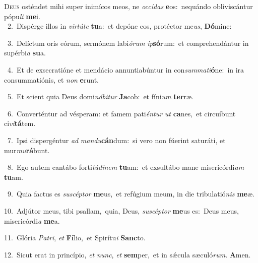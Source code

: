 \lettrine{\initial\textcolor{\initialcolor}{D}}{eus} osténdet mihi super inimícos meos, ne \textit{oc}\-\textit{cí}\textit{das} \textbf{e}\-os:~\star nequándo obliviscántur pópu\textit{li} \textbf{me}\-i.\\
{\numbfont\textcolor{\numbcolor}{~2.}}~Dispérge illos in \textit{vir}\-\textit{tú}\textit{te} \textbf{tu}\-a:~\star et depóne eos, protéctor me\-\textit{us}\-, \textbf{Dó}\-mine:\par
{\numbfont\textcolor{\numbcolor}{~3.}}~Delíctum oris eórum, sermónem labi\-\textit{ó}\-\textit{rum} \textit{ip}\-\textbf{só}rum:~\star et comprehendántur in supérbi\textit{a} \textbf{su}\-a.\par
{\numbfont\textcolor{\numbcolor}{~4.}}~Et de exsecratióne et mendácio annuntiabúntur in con\-\textit{sum}\-\textit{ma}\textit{ti}\textbf{ó}ne:~\star in ira consummatiónis, et \textit{non} \textbf{e}\-runt.\par
{\numbfont\textcolor{\numbcolor}{~5.}}~Et scient quia Deus domi\-\textit{ná}\-\textit{bi}\textit{tur} \textbf{Ja}\-cob:~\star et fíni\textit{um} \textbf{ter}\-ræ.\par
{\numbfont\textcolor{\numbcolor}{~6.}}~Converténtur ad vésperam: et famem pati\-\textit{én}\-\textit{tur} \textit{ut} \textbf{ca}\-nes,~\star et circuíbunt ci\-\textit{vi}\-\textbf{tá}tem.\par
{\numbfont\textcolor{\numbcolor}{~7.}}~Ipsi dispergéntur \textit{ad} \textit{man}\-\textit{du}\textbf{cán}dum:~\star si vero non fúerint saturáti, et mur\-\textit{mu}\-\textbf{rá}bunt.\par
{\numbfont\textcolor{\numbcolor}{~8.}}~Ego autem cantábo forti\-\textit{tú}\-\textit{di}\textit{nem} \textbf{tu}\-am:~\star et exsultábo mane misericórdi\textit{am} \textbf{tu}\-am.\par
{\numbfont\textcolor{\numbcolor}{~9.}}~Quia factus es \textit{su}\-\textit{scép}\textit{tor} \textbf{me}\-us,~\star et refúgium meum, in die tribulatió\textit{nis} \textbf{me}\-æ.\par
{\numbfont\textcolor{\numbcolor}{10.}}~Adjútor meus, tibi psallam,~\dagger quia, Deus, \textit{su}\-\textit{scép}\textit{tor} \textbf{me}\-us es:~\star Deus meus, misericórdi\textit{a} \textbf{me}\-a.\par
{\numbfont\textcolor{\numbcolor}{11.}}~Glória \textit{Pa}\-\textit{tri}, \textit{et} \textbf{Fí}\-lio,~\star et Spirítu\textit{i} \textbf{Sanc}\-to.\par
{\numbfont\textcolor{\numbcolor}{12.}}~Sicut erat in princípio, \textit{et} \textit{nunc}\-, \textit{et} \textbf{sem}\-per,~\star et in sǽcula sæculó\-\textit{rum}\-. \textbf{A}\-men.\par

